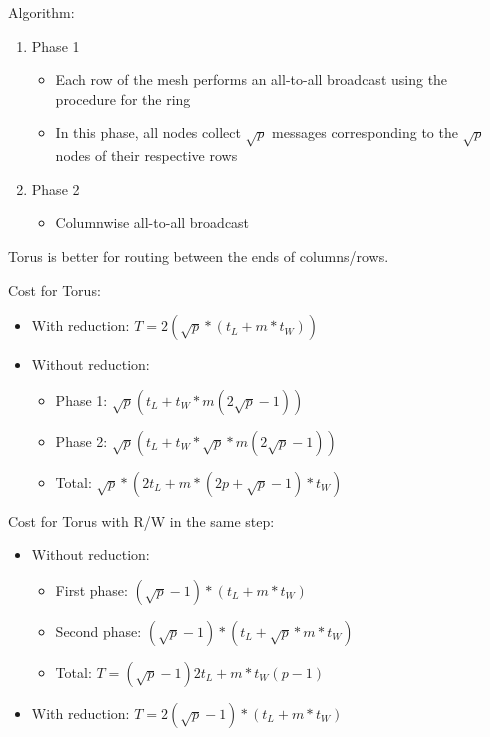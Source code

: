 \documentclass[11pt,a4paper]{report}
\begin{document}
Algorithm:

\begin{enumerate}
    \item Phase 1
    \begin{itemize}
        \item Each row of the mesh performs an all-to-all broadcast using the 
        procedure for the ring
        
        \item In this phase, all nodes collect $\sqrt{p}$ messages 
        corresponding to the $\sqrt{p}$ nodes of their respective rows
    \end{itemize}
    
    \item Phase 2
    \begin{itemize}
        \item Columnwise all-to-all broadcast
    \end{itemize}
\end{enumerate}

Torus is better for routing between the ends of columns/rows.

Cost for Torus:

\begin{itemize}
    \item With reduction: $T = 2(\sqrt{p} * (t_{L} + m *t_{W}))$
    \item Without reduction:
    \begin{itemize}
        \item Phase 1:
        $ \sqrt{p} (t_{L} + t_{W} * m(2\sqrt{p}-1)) $
        
        \item Phase 2:
        $ \sqrt{p} (t_{L} + t_{W} * \sqrt{p} * m(2\sqrt{p}-1)) $
        
        \item Total:
        $ \sqrt{p} * (2t_{L} + m * (2p+\sqrt{p}-1) * t_{W}) $
    \end{itemize}
\end{itemize}

Cost for Torus with R/W in the same step:

\begin{itemize}
    \item Without reduction:
    \begin{itemize}
        \item First phase:
        $ (\sqrt{p}-1) * (t_{L} + m * t_{W}) $
        
        \item Second phase:
        $ (\sqrt{p}-1) * (t_{L} + \sqrt{p} * m * t_{W}) $
        
        \item Total:
        $ T = (\sqrt{p}-1) 2t_{L} + m * t_{W}(p-1) $
    \end{itemize}
    
    \item With reduction: $ T = 2(\sqrt{p}-1) * (t_{L} + m * t_{W}) $
\end{itemize}
\end{document}
